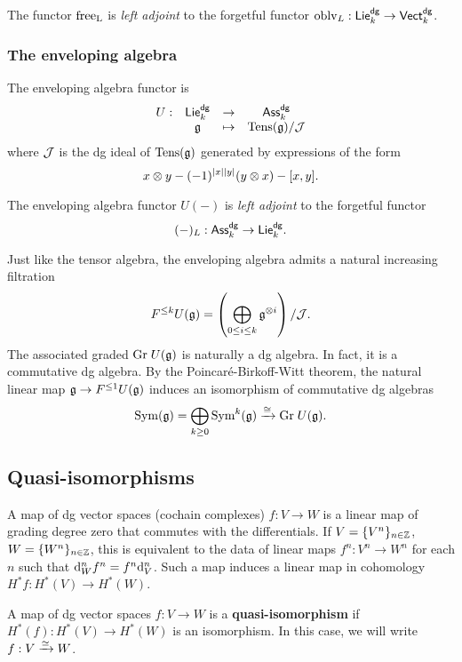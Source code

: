 \documentclass[11pt]{amsart}
\def\dgVect{{\sf Vect}^{\sf dg}}
\def\dgLie{{\sf Lie}^{\sf dg}}
\def\dgAss{{\sf Ass}^{\sf dg}}
\begin{document}
\begin{fact} The functor ${\rm free}_{\rm L}$ is {\em left adjoint} to the forgetful functor $\oblv_L : \dgLie_k \to \dgVect_k$. 
\end{fact}
\subsubsection{The enveloping algebra}

The enveloping algebra functor is
\[
\begin{array}{cccc}
U : & \dgLie_k & \to & \dgAss_k \\
& \fg & \mapsto & \Tens(\fg) / \cJ
\end{array}
\]
where $\mathcal J$ is the dg ideal of ${\rm Tens}(\mathfrak g)$ generated by expressions of the form 
\[
x \otimes y - (-1)^{|x||y|} (y \otimes x) - [x,y].
\]

\begin{fact}
The enveloping algebra functor $U(-)$ is {\em left adjoint} to the forgetful functor 
\[
(-)_L : \dgAss_k \to \dgLie_k .
\]
\end{fact}

\begin{rmk}
Just like the tensor algebra, the enveloping algebra admits a natural increasing filtration
\[
F^{\leq k} U(\mathfrak g) = \left(\bigoplus_{0 \leq i \leq k} \mathfrak g^{\otimes i}\right) / \mathcal J .
\]
The associated graded ${\rm Gr} \; U(\mathfrak g)$ is naturally a dg algebra. 
In fact, it is a commutative dg algebra. 
By the Poincar\'{e}-Birkoff-Witt theorem, the natural linear map $\mathfrak g \to F^{\leq 1}U(\mathfrak g)$ induces an isomorphism of commutative dg algebras
\[
{\rm Sym}(\mathfrak g) = \bigoplus_{k \geq 0} {\rm Sym}^k(\mathfrak g) \xrightarrow{\cong} {\rm Gr} \; U(\mathfrak g) . 
\] 
\end{rmk}

\subsection{Quasi-isomorphisms}\label{sec: quasi}

A map of dg vector spaces (cochain complexes) $f : V \to W$ is a linear map of grading degree zero that commutes with the differentials. 
If $V = \{V^n\}_{n \in \mathbb Z}$, $W = \{W^n\}_{n \in \mathbb Z}$,
this is equivalent to the data of linear maps $f^n : V^n \to W^n$ for each $n$ such that ${\rm d}^n_W f^n = f^n {\rm d}^n_V$. 
Such a map induces a linear map in cohomology $H^*f : H^*(V) \to H^*(W)$. 

\begin{dfn}
A map of dg vector spaces $f : V \to W$ is a {\bf quasi-isomorphism} if $H^*(f) : H^*(V) \to H^*(W)$ is an isomorphism. 
In this case, we will write $f : V \xrightarrow{\simeq} W$. 
\end{dfn}
\end{document}
